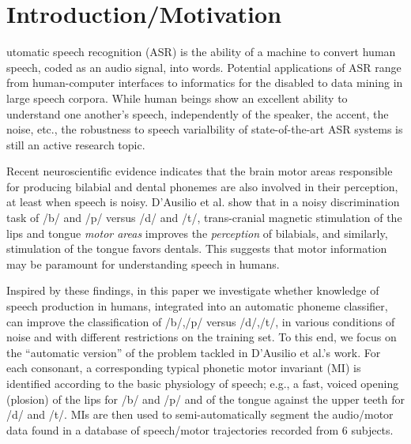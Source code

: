 \section{Introduction/Motivation}
\label{sec:intro}

utomatic speech recognition (ASR) is the ability of a machine
to convert human speech, coded as an audio signal, into words.
Potential applications of ASR range from human-computer interfaces
to informatics for the disabled to data mining in large speech corpora.
While human beings show an excellent ability to understand one another's speech,
independently of the speaker, the accent, the noise, etc., the robustness to
speech varialbility of state-of-the-art ASR systems is still an active research
topic.

Recent neuroscientific evidence indicates that the brain motor areas responsible for
producing bilabial and dental phonemes are also involved in their perception, at least
when speech is noisy. D'Ausilio et al. \cite{dausilio}
show that in a noisy discrimination task of /b/ and /p/ versus /d/
and /t/, trans-cranial magnetic stimulation of the lips and tongue \emph{motor areas}
improves the \emph{perception} of bilabials, and similarly, stimulation of the tongue
favors dentals. This suggests that motor information may be paramount for
understanding speech in humans.

Inspired by these findings, in this paper we investigate whether knowledge of speech
production in humans, integrated into an automatic phoneme classifier, can improve the
classification of /b/,/p/ versus /d/,/t/, in various conditions of noise and with different
restrictions on the training set.
To this end, we focus on the ``automatic version'' of the problem tackled in D'Ausilio et al.'s
work. For each consonant, a corresponding typical phonetic motor invariant (MI) is identified
according to the basic physiology of speech; e.g., a fast, voiced opening (plosion) of the lips
for /b/ and /p/ and of the tongue against the upper teeth for /d/ and /t/.
MIs are then used to semi-automatically segment the audio/motor data found in a
database of speech/motor trajectories recorded from $6$ subjects.

